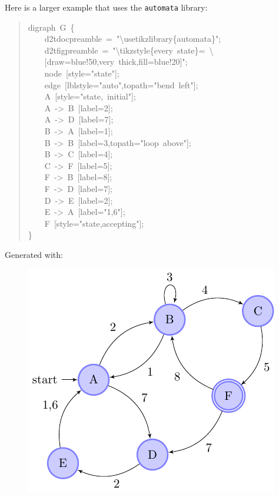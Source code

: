\documentclass[10pt,a4paper,english]{article}
\begin{document}
Here is a larger example that uses the \texttt{automata} library:
\begin{quote}{\ttfamily \raggedright \noindent
digraph~G~{\{}~\\
~~~~d2tdocpreamble~=~"{\textbackslash}usetikzlibrary{\{}automata{\}}";~\\
~~~~d2tfigpreamble~=~"{\textbackslash}tikzstyle{\{}every~state{\}}=~{\textbackslash}~\\
~~~~{[}draw=blue!50,very~thick,fill=blue!20{]}";~\\
~~~~node~{[}style="state"{]};~\\
~~~~edge~{[}lblstyle="auto",topath="bend~left"{]};~\\
~~~~A~{[}style="state,~initial"{]};~\\
~~~~A~->~B~{[}label=2{]};~\\
~~~~A~->~D~{[}label=7{]};~\\
~~~~B~->~A~{[}label=1{]};~\\
~~~~B~->~B~{[}label=3,topath="loop~above"{]};~\\
~~~~B~->~C~{[}label=4{]};~\\
~~~~C~->~F~{[}label=5{]};~\\
~~~~F~->~B~{[}label=8{]};~\\
~~~~F~->~D~{[}label=7{]};~\\
~~~~D~->~E~{[}label=2{]};~\\
~~~~E~->~A~{[}label="1,6"{]};~\\
~~~~F~{[}style="state,accepting"{]};~\\
{\}}
}\end{quote}

Generated with:
\begin{quote}{\ttfamily \raggedright \noindent

}\end{quote}
\begin{figure}[H]
\centering

\includegraphics{pdf/fsm1}
\end{figure}
\end{document}
